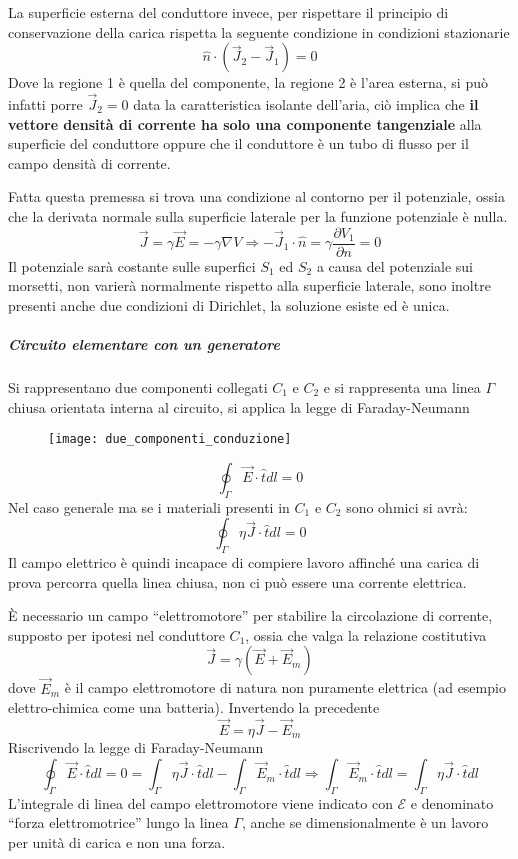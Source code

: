La superficie esterna del conduttore invece, per rispettare il
principio di conservazione della carica rispetta la seguente
condizione in condizioni stazionarie
$$
\hat{n}\cdot\left(\vec{J}_2-\vec{J}_1\right) = 0
$$
Dove la regione 1 è quella del componente, la regione 2 è l'area
esterna, si può infatti porre $\vec{J}_2=0$ data la caratteristica
isolante dell'aria, ciò implica che \textbf{il vettore densità di corrente ha solo una componente tangenziale} alla superficie del conduttore
oppure che il conduttore è un tubo di flusso per il campo densità di 
corrente.

Fatta questa premessa si trova una condizione al contorno per il 
potenziale, ossia che la derivata normale sulla superficie laterale
per la funzione potenziale è nulla.
$$
\vec{J} = \gamma\vec{E} = -\gamma\nabla V \Rightarrow -\vec{J}_1\cdot
\hat{n} = \gamma \frac{\partial V_1}{\partial n} = 0
$$
Il potenziale sarà costante sulle superfici $S_1$ ed $S_2$ a causa
del potenziale sui morsetti, non varierà normalmente rispetto
alla superficie laterale, sono inoltre presenti anche due condizioni 
di Dirichlet, la soluzione esiste ed è unica.

\subparagraph{Circuito elementare con un generatore}
Si rappresentano due componenti collegati $C_1$ e $C_2$ e si 
rappresenta una linea $\Gamma$ chiusa orientata interna al circuito,
si applica la legge di Faraday-Neumann
\begin{figure}[H]
\centering
\texttt{[image: due\_componenti\_conduzione]}
\end{figure}
$$
\oint_\Gamma\vec{E}\cdot\hat{t}dl = 0
$$
Nel caso generale ma se i materiali presenti in $C_1$ e $C_2$ sono
ohmici si avrà:
$$
\oint_\Gamma \eta\vec{J}\cdot\hat{t}dl = 0
$$
Il campo elettrico è quindi incapace di compiere lavoro affinché una 
carica di prova percorra quella linea chiusa, non ci può essere una 
corrente elettrica.

È necessario un campo ``elettromotore'' per stabilire la circolazione
di corrente, supposto per ipotesi nel conduttore $C_1$, ossia che
valga la relazione costitutiva
$$
\vec{J} = \gamma \left(\vec{E}+\vec{E}_m\right)
$$
dove $\vec{E}_m$ è il campo elettromotore di natura non puramente
elettrica (ad esempio elettro-chimica come una batteria).
Invertendo la precedente
$$
\vec{E} = \eta\vec{J} - \vec{E}_m
$$
Riscrivendo la legge di Faraday-Neumann
$$
\oint_{\Gamma}\vec{E}\cdot\hat{t}dl =  0 = \int_\Gamma \eta\vec{J}
\cdot\hat{t}dl - \int_\Gamma \vec{E}_m \cdot \hat{t}dl\Rightarrow
\int_\Gamma \vec{E}_m\cdot\hat{t}dl = \int_\Gamma \eta\vec{J}
\cdot\hat{t}dl
$$
L'integrale di linea del campo elettromotore viene indicato 
con
$\mathcal{E}$ e denominato ``forza elettromotrice'' lungo
la linea $\Gamma$, anche se dimensionalmente è un lavoro per unità
di carica e non una forza.

